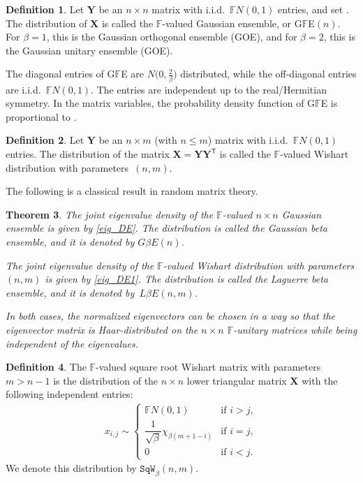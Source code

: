 \documentclass[pdftex]{sigma}
\numberwithin{equation}{section}
\newtheorem{Theorem}{Theorem}[section]
\theoremstyle{definition}
\newtheorem{Definition}[Theorem]{Definition}
\newcommand{\FF}{{\mathbb{F}}}
\newcommand{\Tr}{\textup{Tr}}
\newcommand{\T}{\dag}
\newcommand{\mbf}[1]{\mathbf{#1}}
\newcommand{\SQW}{\mathtt{SqW}_\beta}
\begin{document}
\begin{Definition}
 Let $\mbf{Y}$ be an $n\times n$ matrix with i.i.d.~$\FF N(0,1)$ entries, and set \smash{$\mbf{X}=\frac1{\sqrt{2}} \bigl(\mbf{Y}+\mbf{Y}^{\T}\bigr)$}. The distribution of $\mbf{X}$ is called the $\FF$-valued Gaussian ensemble, or G$\FF$E$(n)$. For $\beta=1$, this is the Gaussian orthogonal ensemble (GOE), and for $\beta=2$, this is the Gaussian unitary ensemble (GOE).
\end{Definition}

The diagonal entries of G$\FF$E are $N\bigl(0,\frac{2}{\beta}\bigr)$ distributed, while the off-diagonal entries are i.i.d.~$\FF N(0,1)$. The entries are independent up to the real/Hermitian symmetry. In the matrix variables, the probability density function of G$\FF$E is proportional to \smash{$ {\rm e}^{-\frac{\beta}{4} \Tr \mbf{X}\mbf{X}^{\T}}$}.

\begin{Definition}
 Let $\mbf{Y}$ be an $n\times m$ (with $n\le m$) matrix with i.i.d.~$\FF N(0,1)$ entries. The distribution of the matrix $\mbf{X}=\mbf{Y}\mbf{Y}^{\mathsf T}$ is called the $\FF$-valued Wishart distribution with parameters~$(n,m)$.
\end{Definition}

The following is a classical result in random matrix theory.
\begin{Theorem}
 The joint eigenvalue density of the $\FF$-valued $n\times n$ Gaussian ensemble is given by \eqref{eig_DE}. The distribution is called the Gaussian beta ensemble, and it is denoted by $G{\beta}E(n)$.

The joint eigenvalue density of the $\FF$-valued Wishart distribution with parameters $(n,m)$ is given by \eqref{eig_DE1}.
 The distribution is called the Laguerre beta ensemble, and it is denoted by~$L{\beta}E(n,m)$.

In both cases, the normalized eigenvectors can be chosen in a way so that the eigenvector matrix is Haar-distributed on the $n\times n$ $\FF$-unitary matrices while being independent of the eigenvalues.
\end{Theorem}

\begin{Definition}
The $\FF$-valued square root Wishart matrix with parameters $ m> n-1$ is the distribution of the $n\times n$ lower triangular matrix $\mbf{X}$ with the following independent entries:
\begin{align*}
 x_{i,j}\sim \begin{cases}
 \FF N(0,1)& \text{if $i>j$},\\
 \dfrac{1}{\sqrt{\beta}} \chi_{\beta (m+1-i)}& \text{if $i=j$},\\
 0& \text{if $i<j$}.
 \end{cases}
\end{align*}
 We denote this distribution by $\SQW(n,m)$.
\end{Definition}
\end{document}
